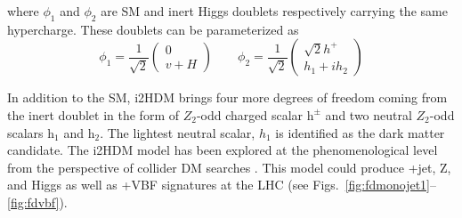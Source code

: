 where $\phi_1$ and  $\phi_2$ are SM and inert Higgs doublets respectively carrying the same hypercharge. These doublets can be parameterized as
\begin{equation}
  \phi_1=\frac{1}{\sqrt{2}}
  \begin{pmatrix}
    0\\
    v+H 
  \end{pmatrix}
  \qquad
  \phi_2= \frac{1}{\sqrt{2}}
  \begin{pmatrix}
    \sqrt{2}{h^+} \\
    h_1 + ih_2
  \end{pmatrix}
\end{equation}

In addition to the SM, i2HDM brings four more degrees of
freedom coming from the inert doublet in the form of $Z_2$-odd charged
scalar $\textrm{h}^\pm$ and two neutral $Z_2$-odd scalars
$\textrm{h}_1$ and $\textrm{h}_2$. The lightest neutral scalar, $h_1$
is identified as the dark matter candidate. The i2HDM model has been explored at the
phenomenological level from the perspective of collider DM searches
\cite{Burgess:2000yq, Andreas:2008xy, Arhrib:2013ela, Belyaev:2015tap}. This model could produce \MET+jet, Z, and Higgs as well as \MET+VBF signatures at the LHC (see Figs.~\ref{fig:fdmonojet1}--\ref{fig:fdvbf}).

